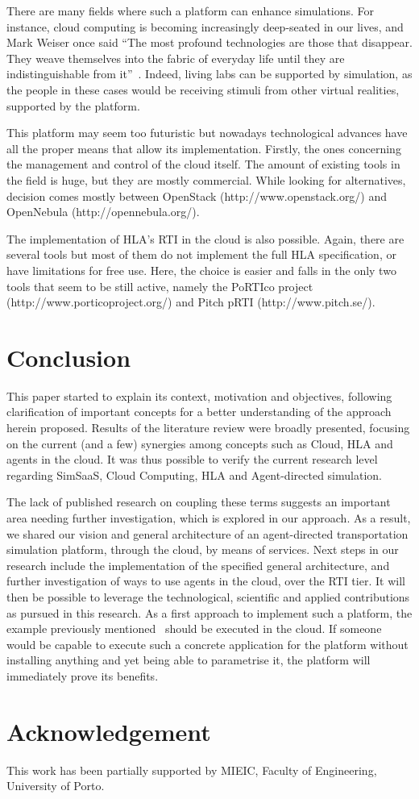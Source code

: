 \documentclass[conference]{IEEEtran}
\begin{document}
There are many fields where such a platform can enhance simulations. For instance, cloud computing is becoming increasingly deep-seated in our lives, and Mark Weiser once said ``The most profound technologies are those that disappear. They weave themselves into the fabric of everyday life until they are indistinguishable from it''~\cite{weiser1991computer}. Indeed, living labs can be supported by simulation, as the people in these cases would be receiving stimuli from other virtual realities, supported by the platform.

This platform may seem too futuristic but nowadays technological advances have all the proper means that allow its implementation. Firstly, the ones concerning the management and control of the cloud itself. The amount of existing tools in the field is huge, but they are mostly commercial. While looking for alternatives, decision comes mostly between OpenStack (http://www.openstack.org/) and OpenNebula (http://opennebula.org/).

The implementation of HLA's RTI in the cloud is also possible. Again, there are several tools but most of them do not implement the full HLA specification, or have limitations for free use. Here, the choice is easier and falls in the only two tools that seem to be still active, namely the PoRTIco project (http://www.porticoproject.org/) and Pitch pRTI (http://www.pitch.se/).


\section{Conclusion}

This paper started to explain its context, motivation and objectives, following clarification of important concepts for a better understanding of the approach herein proposed. Results of the literature review were broadly presented, focusing on the current (and a few) synergies among concepts such as Cloud, HLA and agents in the cloud. It was thus possible to verify the current research level regarding SimSaaS, Cloud Computing, HLA and Agent-directed simulation. 

The lack of published research on coupling these terms suggests an important area needing further investigation, which is explored in our approach. As a result, we shared our vision and general architecture of an agent-directed transportation simulation platform, through the cloud, by means of services. Next steps in our research include the implementation of the specified general architecture, and further investigation of ways to use agents in the cloud, over the RTI tier. It will then be possible to leverage the technological, scientific and applied contributions as pursued in this research. As a first approach to implement such a platform, the example previously mentioned~\cite{macedo2013integrated} should be executed in the cloud. If someone would be capable to execute such a concrete application for the platform without installing anything and yet being able to parametrise it, the platform will immediately prove its benefits.

\section*{Acknowledgement}
This work has been partially supported by MIEIC, Faculty of Engineering, University of Porto.







\end{document}
